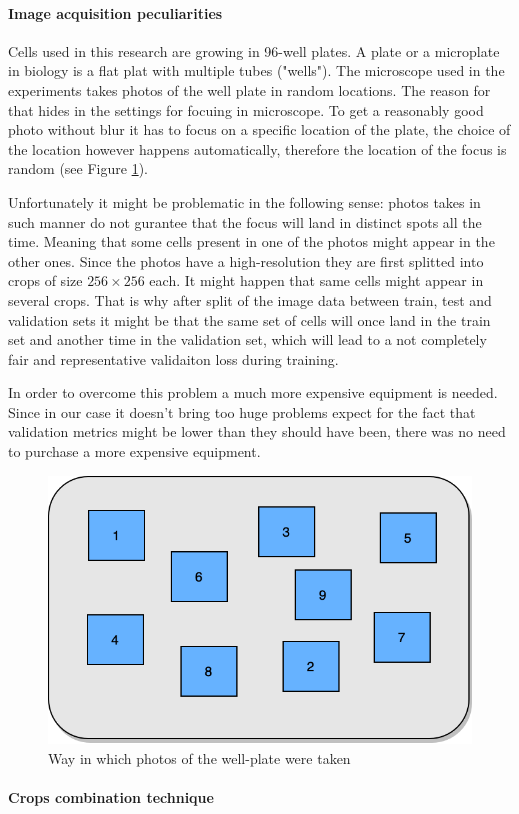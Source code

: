 \paragraph{Image acquisition peculiarities} 
    Cells used in this research are growing in 96-well plates. A plate or a microplate in biology is a flat plat with multiple tubes ("wells"). The microscope used in the experiments takes photos of the well plate in random locations. The reason for that hides in the settings for focuing in microscope. To get a reasonably good photo without blur it has to focus on a specific location of the plate, the choice of the location however happens automatically, therefore the location of the focus is random (see Figure \ref{fig:random-dic}). 
    
    Unfortunately it might be problematic in the following sense: photos takes in such manner do not gurantee that the focus will land in distinct spots all the time. Meaning that some cells present in one of the photos might appear in the other ones. Since the photos have a high-resolution they are first splitted into crops of size $256 \times 256$ each. It might happen that same cells might appear in several crops. That is why after split of the image data between train, test and validation sets it might be that the same set of cells will once land in the train set and another time in the validation set, which will lead to a not completely fair and representative validaiton loss during training.
    
    In order to overcome this problem a much more expensive equipment is needed. Since in our case it doesn't bring too huge problems expect for the fact that validation metrics might be lower than they should have been, there was no need to purchase a more expensive equipment.   
    
    \begin{figure}[htb]
        \begin{center}
            \includegraphics[width=0.3\linewidth]{bilder/dic-random.png}
            \caption{Way in which photos of the well-plate were taken}\label{fig:random-dic}
        \end{center}
    \end{figure}    
\paragraph{Crops combination technique}
    